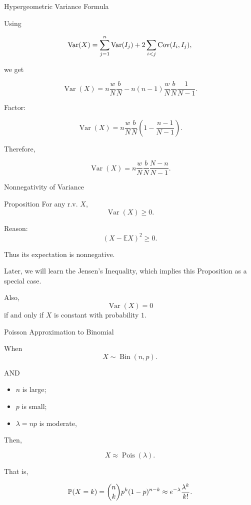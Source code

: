 \begin{frame}{Hypergeometric Variance Formula}

Using

\[
\operatorname{Var}(X)
=
\sum_{j=1}^n \operatorname{Var}(I_j)
+
2\sum_{i<j}\operatorname{Cov}(I_i,I_j),
\]

we get

\[
\operatorname{Var}(X)
=
n\frac{w}{N}\frac{b}{N}
-
n(n-1)\frac{w}{N}\frac{b}{N}\frac{1}{N-1}.
\]

Factor:

\[
\operatorname{Var}(X)
=
n\frac{w}{N}\frac{b}{N}
\left(
1-\frac{n-1}{N-1}
\right).
\]

Therefore,

\[
{
\operatorname{Var}(X)
=
n\frac{w}{N}\frac{b}{N}
\frac{N-n}{N-1}.
}
\]

\end{frame}






\begin{frame}{Nonnegativity of Variance}
\begin{keybox}{Proposition} For any r.v. $X$,
\[
\operatorname{Var}(X)\geq0.
\]
\end{keybox}

\vspace{0.25cm}

Reason:
\[
(X-\mathbb{E}X)^2\geq0.
\]

Thus its expectation is nonnegative.

Later, we will learn the Jensen's Inequality, which implies this Proposition as a special case.

Also,
\[
\operatorname{Var}(X)=0
\]
if and only if $X$ is constant with probability $1$.
\end{frame}


\begin{frame}{Poisson Approximation to Binomial}

When
\[
X\sim \operatorname{Bin}(n,p).
\]

AND

\begin{itemize}
    \item $n$ is large;
    
    \item $p$ is small;
    
    \item  $\lambda=np$ is moderate,
\end{itemize}
Then,

\[
\boxed{
X\approx \operatorname{Pois}(\lambda).
}
\]

That is,

\[
\mathbb{P}(X=k) = \binom{n}{k}p^k(1-p)^{n-k}
\approx
e^{-\lambda}\frac{\lambda^k}{k!}.
\]

\vspace{0.25cm}


\end{frame}




